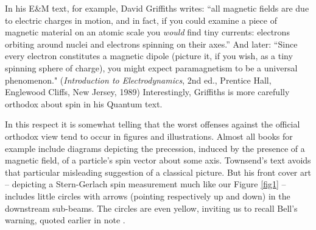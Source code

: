\documentclass[aps,prc,onecolumn,letterpaper,floatfix,12pt]{revtex4}
\begin{document}
\begin{thebibliography}{99}
 In his E\&M text, for example, David Griffiths writes:  ``all
  magnetic fields are due to electric charges in motion, and in fact,
  if you could examine a piece of magnetic material on an atomic scale
  you \emph{would} find tiny currents:  electrons orbiting around
  nuclei and electrons spinning on their axes.''  And later:  ``Since
  every electron constitutes a magnetic dipole (picture it, if you
  wish, as a tiny spinning sphere of charge), you might 
  expect paramagnetism to be a universal phenomenon."
  (\emph{Introduction to Electrodynamics}, 2nd ed., Prentice Hall,
  Englewood Cliffs, New Jersey, 1989)  Interestingly, Griffiths is
  more carefully orthodox about spin in his Quantum text.

  In
this respect it is somewhat telling that the worst offenses against
the official orthodox view tend to occur in figures and
illustrations.  Almost all books for example
include diagrams depicting the precession, induced by the presence of
a magnetic field, of a particle's spin vector about some axis.  Townsend's text
avoids that particular misleading suggestion of a classical picture.
But his front cover art -- depicting a Stern-Gerlach spin measurement
much like our Figure \ref{fig1} -- includes little circles with arrows
(pointing respectively up and down) in the downstream sub-beams.  The
circles are even yellow, inviting us to recall Bell's warning, quoted
earlier in note \cite{history}.



\end{thebibliography}
\end{document}
